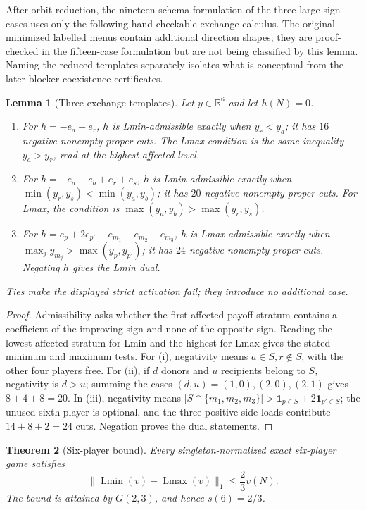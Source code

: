 \documentclass[11pt]{article}
\newtheorem{theorem}{Theorem}
\newtheorem{lemma}[theorem]{Lemma}
\newcommand{\Lmin}{\operatorname{Lmin}}
\newcommand{\Lmax}{\operatorname{Lmax}}
\begin{document}
After orbit reduction, the nineteen-schema formulation of the three large
sign cases uses only the following hand-checkable exchange calculus.  The
original minimized labelled menus contain additional direction shapes; they
are proof-checked in the fifteen-case formulation but are not being classified
by this lemma.  Naming the reduced templates separately isolates what is
conceptual from the later blocker-coexistence certificates.

\begin{lemma}[Three exchange templates]\label{lem:orbittemplates}
Let $y\in\mathbb R^6$ and let $h(N)=0$.
\begin{enumerate}[label=(\roman*),nosep]
\item For $h=-e_a+e_r$, $h$ is Lmin-admissible exactly when $y_r<y_a$;
      it has $16$ negative nonempty proper cuts.  The Lmax condition is the
      same inequality $y_a>y_r$, read at the highest affected level.
\item For $h=-e_a-e_b+e_r+e_s$, $h$ is Lmin-admissible exactly when
      $\min(y_r,y_s)<\min(y_a,y_b)$; it has $20$ negative nonempty proper
      cuts.  For Lmax, the condition is
      $\max(y_a,y_b)>\max(y_r,y_s)$.
\item For
      $h=e_p+2e_{p'}-e_{m_1}-e_{m_2}-e_{m_3}$, $h$ is Lmax-admissible
      exactly when
      $\max_j y_{m_j}>\max(y_p,y_{p'})$; it has $24$ negative nonempty
      proper cuts.  Negating $h$ gives the Lmin dual.
\end{enumerate}
Ties make the displayed strict activation fail; they introduce no additional
case.
\end{lemma}

\begin{proof}
Admissibility asks whether the first affected payoff stratum contains a
coefficient of the improving sign and none of the opposite sign.  Reading the
lowest affected stratum for Lmin and the highest for Lmax gives the stated
minimum and maximum tests.  For (i), negativity means $a\in S,r\notin S$,
with the other four players free.  For (ii), if $d$ donors and $u$ recipients
belong to $S$, negativity is $d>u$; summing the cases $(d,u)=(1,0),(2,0),
(2,1)$ gives $8+4+8=20$.  In (iii), negativity means
$|S\cap\{m_1,m_2,m_3\}|>\mathbf{1}_{p\in S}+2\mathbf{1}_{p'\in S}$; the unused
sixth player is optional, and the three positive-side loads contribute
$14+8+2=24$ cuts.  Negation proves the dual statements.
\end{proof}

\begin{theorem}[Six-player bound]\label{thm:s6}
Every singleton-normalized exact six-player game satisfies
\[
 \|\Lmin(v)-\Lmax(v)\|_1\le \frac23v(N).
\]
The bound is attained by $G(2,3)$, and hence $s(6)=2/3$.
\end{theorem}
\end{document}
